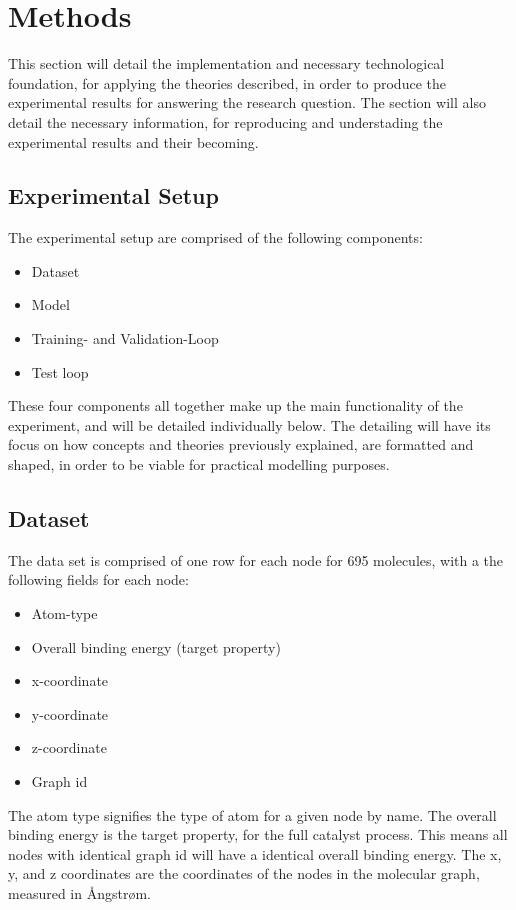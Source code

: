 \section{Methods}\label{sec:methods}

This section will detail the implementation and necessary technological foundation, for applying the theories described,
in order to produce the experimental results for answering the research question. The section will also detail the necessary information,
for reproducing and understading the experimental results and their becoming.

\subsection{Experimental Setup}\label{subsec:setup}
The experimental setup are comprised of the following components:
\begin{itemize}
    \item Dataset
    \item Model
    \item Training- and Validation-Loop
    \item Test loop
\end{itemize}

These four components all together make up the main functionality of the experiment, and will be detailed individually
below. The detailing will have its focus on how concepts and theories previously explained,
are formatted and shaped, in order to be viable for practical modelling purposes.

\subsection{Dataset}\label{subsec:dataset}
The data set is comprised of one row for each node for 695 molecules, with a the following fields for each node:
\begin{itemize}
    \item Atom-type
    \item Overall binding energy (target property)
    \item x-coordinate
    \item y-coordinate
    \item z-coordinate
    \item Graph id
\end{itemize}
The atom type signifies the type of atom for a given node by name. The overall binding energy is the target property, for the full catalyst
process. This means all nodes with identical graph id will have a identical overall binding energy. The x, y, and z coordinates are the coordinates
of the nodes in the molecular graph, measured in Ångstrøm.

